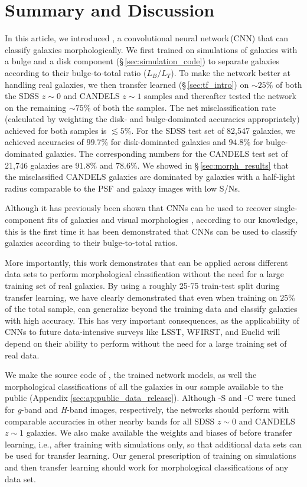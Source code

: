 \section{Summary and Discussion} \label{sec:disc}
In this article, we introduced \gamornet{}, a convolutional neural network\,(CNN) that can classify galaxies morphologically. We first trained \gamornet{} on simulations of galaxies with a bulge and a disk component (\S\,\ref{sec:simulation_code}) to separate galaxies according to their bulge-to-total ratio ($L_B/L_T$). To make the network better at handling real galaxies, we then transfer learned (\S\,\ref{sec:tf_intro}) on $\sim25\%$ of both the SDSS $z\sim0$ and CANDELS $z\sim1$ samples and thereafter tested the network on the remaining $\sim75\%$ of both the samples. The net misclassification rate (calculated by weighting the disk- and bulge-dominated accuracies appropriately) achieved for both samples is $\lesssim 5\%$. For the SDSS test set of 82,547 galaxies, we achieved accuracies of $99.7\%$ for disk-dominated galaxies and $94.8\%$ for bulge-dominated galaxies. The corresponding numbers for the CANDELS test set of 21,746 galaxies are $91.8\%$ and $78.6\%$. We showed in \S\,\ref{sec:morph_results} that the misclassified CANDELS galaxies are dominated by galaxies with a half-light radius comparable to the PSF and galaxy images with low S/Ns. 

Although it has previously been shown that CNNs can be used to recover single-component \sersic{} fits of galaxies and visual morphologies \citep[eg.][]{Huertas-Company2015ALEARNING,Tuccillo2018DeepFitting}, according to our knowledge, this is the first time it has been demonstrated that CNNs can be used to classify galaxies according to their bulge-to-total ratios.

More importantly, this work demonstrates that \gamornet{} can be applied across different data sets to perform morphological classification without the need for a large training set of real galaxies. By using a roughly 25-75 train-test split during transfer learning, we have clearly demonstrated that even when training on $25\%$ of the total sample, \gamornet{} can generalize beyond the training data and classify galaxies with high accuracy. This has very important consequences, as the applicability of CNNs to future data-intensive surveys like LSST, WFIRST, and Euclid will depend on their ability to perform without the need for a large training set of real data.

We make the source code of \gamornet{}, the trained network models, as well the morphological classifications of all the galaxies in our sample available to the public (Appendix \ref{sec:ap:public_data_release}). Although \gamornet{}-S and -C were tuned for \textit{g}-band and \textit{H}-band images, respectively, the networks should perform with comparable accuracies in other nearby bands for all SDSS $z\sim0$ and CANDELS $z\sim1$ galaxies. We also make available the weights and biases of \gamornet{} before transfer learning, i.e., after training with simulations only, so that additional data sets can be used for transfer learning. Our general prescription of training on simulations and then transfer learning should work for morphological classifications of any data set.

